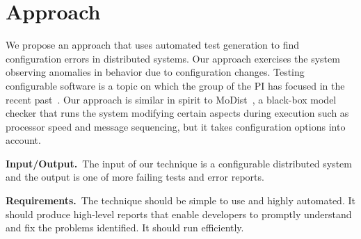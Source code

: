\documentclass[11pt]{article}
\newcommand{\eg}{e.g.}
\newcommand{\Comment}[1]{}
\begin{document}








\section{Approach\Comment{Solution Design (Error Classification from
    Distributed Traces)}}

We propose an approach that uses automated test generation to find
configuration errors in distributed systems.  Our approach exercises
the system observing anomalies in behavior due to configuration
changes. Testing configurable software is a topic on which the group
of the PI has focused in the recent
past~\cite{kim-etal-fse2013,souto-etal-splc2015,souto-etal-icse2017,souto-damorim-jss2017}.
Our approach is similar in spirit to MoDist~\cite{yang-etal-nsdi09}, a
black-box model checker that runs the system modifying certain aspects
during execution such as processor speed and message sequencing, but
it takes configuration options into account.

\vspace{1ex}\noindent\textbf{Input/Output.}~The input of our technique
is a configurable distributed system and the output is one of more
failing tests and error reports.



\vspace{1ex}\noindent\textbf{Requirements.}~The technique should be
simple to use and highly automated. It should produce high-level
reports that enable developers to promptly understand and fix the
problems identified. It should run efficiently.

\end{document}
